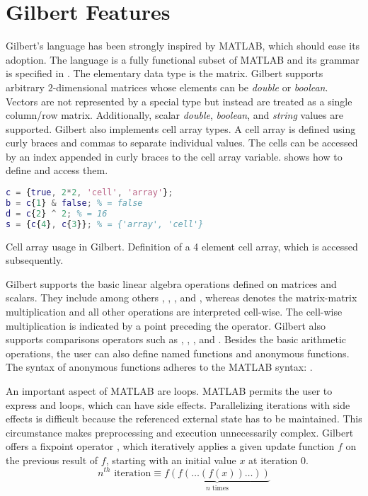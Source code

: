 \section{Gilbert Features}
\label{sec:gilbertFeatures}

Gilbert's language has been strongly inspired by MATLAB, which should ease its adoption.
The language is a fully functional subset of MATLAB and its grammar is specified in \cite{Rohrmann2014}.
The elementary data type is the matrix. 
Gilbert supports arbitrary $2$-dimensional matrices whose elements can be \emph{double} or \emph{boolean}.
Vectors are not represented by a special type but instead are treated as a single column/row matrix.
Additionally, scalar \emph{double}, \emph{boolean}, and \emph{string} values are supported. 
Gilbert also implements cell array types.
A cell array is defined using curly braces and commas to separate individual values. 
The cells can be accessed by an index appended in curly braces to the cell array variable. 
 shows how to define and access them.
\begin{listing}[!h]
    \begin{lstlisting}[language=Matlab,
        commentstyle=\color{black},
        stringstyle=\color{black},
        xleftmargin=.2\textwidth,
        basicstyle=\small
    ]
c = {true, 2*2, 'cell', 'array'};
b = c{1} & false; % = false
d = c{2} ^ 2; % = 16
s = {c{4}, c{3}}; % = {'array', 'cell'} 
    \end{lstlisting}
  \caption{Cell array usage in Gilbert. Definition of a 4 element cell array, which is accessed subsequently.}
  \label{lst:cellArray}
\end{listing}

Gilbert supports the basic linear algebra operations defined on matrices and scalars. 
They include among others \code{+}, \code{-}, \code{/}, and \code{*}, whereas \code{*} denotes the matrix-matrix multiplication and all other operations are interpreted cell-wise. 
The cell-wise multiplication is indicated by a point preceding the operator. 
Gilbert also supports comparisons operators such as \code{>}, \code{>=}, \code{==}, and \code{\textasciitilde=}. 
Besides the basic arithmetic operations, the user can also define named functions and anonymous functions. 
The syntax of anonymous functions adheres to the MATLAB syntax: . 

An important aspect of MATLAB are loops. 
MATLAB permits the user to express  and  loops, which can have side effects. 
Parallelizing iterations with side effects is difficult because the referenced external state has to be maintained. 
This circumstance makes preprocessing and execution unnecessarily complex. 
Gilbert offers a fixpoint operator , which iteratively applies a given update function $f$ on the previous result of $f$, starting with an initial value $x$ at iteration $0$.
\small
\begin{displaymath}
  n^{th}\text{ iteration}\equiv\underbrace{f(f(\ldots(f(x))\ldots))}_{\text{$n$ times}}
\end{displaymath}
\normalsize

